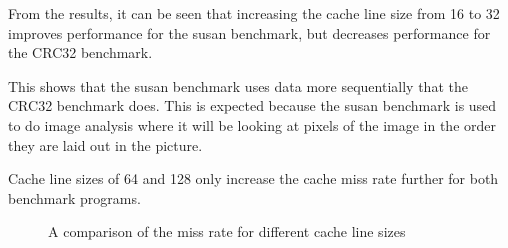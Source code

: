 From the results, it can be seen that increasing the cache line size from 16 to 32 
improves performance for the susan benchmark, but decreases performance for the CRC32 
benchmark. 

This shows that the susan benchmark uses data more sequentially that the CRC32 benchmark 
does.
This is expected because the susan benchmark is used to do image analysis where it will be 
looking at pixels of the image in the order they are laid out in the picture.

Cache line sizes of 64 and 128 only increase the cache miss rate further for 
both benchmark programs.

\begin{figure}[H]
    \centering
    
    \caption{A comparison of the miss rate for different cache line sizes}
    \label{fig:partb-cacheln}
\end{figure}